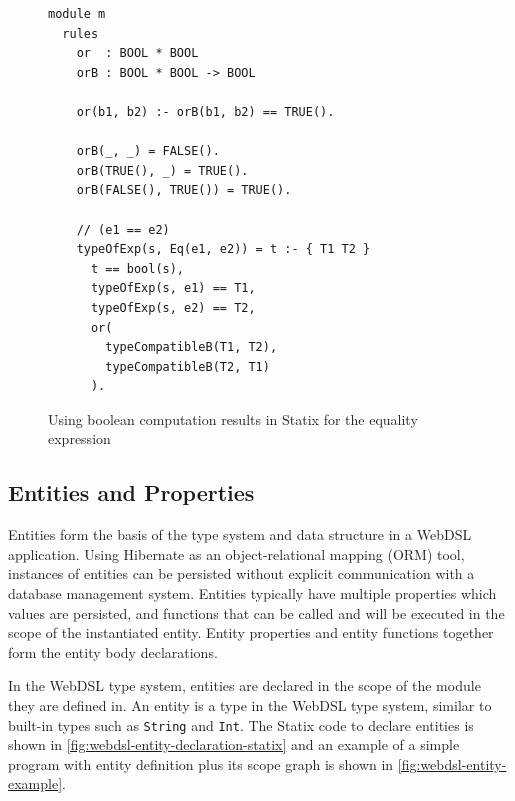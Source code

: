       \begin{figure}
        \begin{verbatim}
module m
  rules
    or  : BOOL * BOOL
    orB : BOOL * BOOL -> BOOL

    or(b1, b2) :- orB(b1, b2) == TRUE().
    
    orB(_, _) = FALSE().
    orB(TRUE(), _) = TRUE().
    orB(FALSE(), TRUE()) = TRUE().

    // (e1 == e2)
    typeOfExp(s, Eq(e1, e2)) = t :- { T1 T2 }
      t == bool(s),
      typeOfExp(s, e1) == T1,
      typeOfExp(s, e2) == T2,
      or(
        typeCompatibleB(T1, T2),
        typeCompatibleB(T2, T1)
      ).
        \end{verbatim}
        \caption{\label{fig:boolean-computation-for-equality-expression}Using boolean computation results in Statix for the equality expression}
      \end{figure}

    \subsection{\label{subsec:simple-entities}Entities and Properties}

      Entities form the basis of the type system and data structure in a WebDSL application. Using Hibernate as an object-relational mapping (ORM) tool, instances of entities can be persisted without explicit communication with a database management system. Entities typically have multiple properties which values are persisted, and functions that can be called and will be executed in the scope of the instantiated entity. Entity properties and entity functions together form the entity body declarations.

      In the WebDSL type system, entities are declared in the scope of the module they are defined in. An entity is a type in the WebDSL type system, similar to built-in types such as \texttt{String} and \texttt{Int}. The Statix code to declare entities is shown in \cref{fig:webdsl-entity-declaration-statix} and an example of a simple program with entity definition plus its scope graph is shown in \cref{fig:webdsl-entity-example}.

